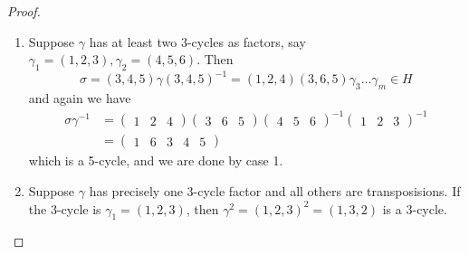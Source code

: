\begin{proof}
\begin{enumerate}
      \item Suppose $\gamma$ has at least two 3-cycles as factors, say $\gamma_1 = (1, 2, 3), \gamma_2 = (4, 5, 6)$. Then 
      \begin{equation}
        \sigma = (3, 4, 5) \gamma (3, 4, 5)^{-1} = (1, 2, 4) (3, 6, 5) \gamma_3 \ldots \gamma_m \in H
      \end{equation}
      and again we have 
      \begin{align}
        \sigma \gamma ^{-1} & = 
        \begin{pmatrix} 1 & 2 & 4 \end{pmatrix}
        \begin{pmatrix} 3 & 6 & 5 \end{pmatrix}
        \begin{pmatrix} 4 & 5 & 6 \end{pmatrix}^{-1}
        \begin{pmatrix} 1 & 2 & 3 \end{pmatrix}^{-1} \\ 
                          & = \begin{pmatrix} 1 & 6 & 3 & 4 & 5 \end{pmatrix}
      \end{align}
      which is a 5-cycle, and we are done by case 1. 

      \item Suppose $\gamma$ has precisely one 3-cycle factor and all others are transposisions. If the 3-cycle is $\gamma_1 = (1, 2, 3)$, then $\gamma^2 = (1, 2, 3)^2 = (1, 3, 2)$ is a $3$-cycle. 


\end{enumerate}
\end{proof}
